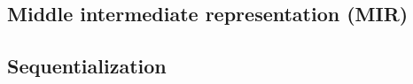 \documentclass[index.tex]{subfiles}
\begin{document}
\subsection{Middle intermediate representation (MIR)}
\label{sec:mir}

\subsection{Sequentialization}
\label{sec:sequentialization}
\end{document}
